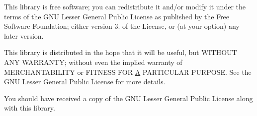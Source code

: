 This library is free software; you can redistribute it and/or modify it under the terms of the G\-N\-U Lesser General Public License as published by the Free Software Foundation; either version 3. of the License, or (at your option) any later version.

This library is distributed in the hope that it will be useful, but W\-I\-T\-H\-O\-U\-T A\-N\-Y W\-A\-R\-R\-A\-N\-T\-Y; without even the implied warranty of M\-E\-R\-C\-H\-A\-N\-T\-A\-B\-I\-L\-I\-T\-Y or F\-I\-T\-N\-E\-S\-S F\-O\-R \hyperlink{classA}{A} P\-A\-R\-T\-I\-C\-U\-L\-A\-R P\-U\-R\-P\-O\-S\-E. See the G\-N\-U Lesser General Public License for more details.

You should have received a copy of the G\-N\-U Lesser General Public License along with this library. 